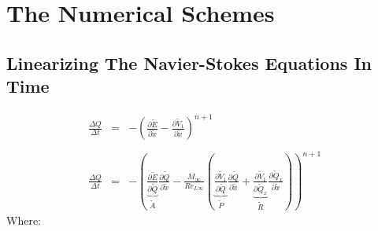 \documentclass[11pt, a4paper]{article}
\newcommand{\parder}[2]{\frac{\partial {#1}}{\partial {#2}}}
\begin{document}
\section{The Numerical Schemes}
\subsection{Linearizing The Navier-Stokes Equations In Time}
\begin{equation}
    \begin{array}{lcl}
        \displaystyle\frac{\Delta Q}{\Delta t} & = & \displaystyle-\left(\parder{\tilde{E}}{\tilde{x}}-\parder{\tilde{V}_1}{\tilde{x}}\right)^{n+1} \\\\
        \displaystyle\frac{\Delta Q}{\Delta t} & = & \displaystyle-\left(\underbrace{\parder{\tilde{E}}{\tilde{Q}}}_{\tilde{A}}\parder{\tilde{Q}}{\tilde{x}}-\frac{M_\infty}{Re_{L\infty}}\left(\underbrace{\parder{\tilde{V}_1}{\tilde{Q}}}_{\tilde{P}}\parder{\tilde{Q}}{\tilde{x}}+\underbrace{\parder{\tilde{V}_1}{\tilde{Q}_x}}_{\tilde{R}}\parder{\tilde{Q}_x}{\tilde{x}}\right)\right)^{n+1}
    \end{array}
\end{equation}
Where:
\end{document}

